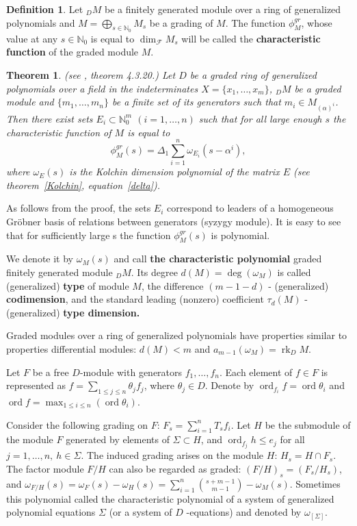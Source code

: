 \documentclass[a4paper,reqno,12pt]{amsart}
\theoremstyle{plain}
\newtheorem{theorem}{Theorem}
\theoremstyle{remark}
\theoremstyle{definition}
\newtheorem{definition}{Definition}
\renewcommand{\le}{\leqslant}
\DeclareMathOperator {\ord}{ord}
\DeclareMathOperator {\rk}{rk}
\newcommand{\N}{\mathbb{N}}
\def\deg{\operatorname{deg}}
\def\ord{\operatorname{ord}}
\def\F{\mathcal {F}}
\begin{document}
\begin{definition}
Let $_D M$ be a finitely generated module over a ring of generalized
polynomials and $M=\bigoplus_{s\in\N_0}M_{s}$ be
a grading of $M$. The function $\phi_M^{gr}$, whose value at
any  
$s\in\N_0$ is equal to 
$\dim_\F M_{s}$ will
be called the {\bf characteristic function} of the graded module $M$.
\end{definition}

\begin{theorem}\label{4.3.20} (see \cite{KLMP}, theorem 4.3.20.)
Let $D$ be a graded ring of generalized polynomials over a field in
the indeterminates $X=\{x_1,\dots,x_m\}$,
$_D M$ be a graded module and  $\{m_1,\dots,m_n\}$ be a finite
set of its generators such that $m_i\in M_{(\alpha)^i}$.
Then there exist sets $E_i\subset\N_0^m$ $(i=1,\dots,n)$ such that for all large
enough $s$ the characteristic function of $M$ is equal
to
\begin{equation}\label{eq0}
  \phi_M^{gr}(s)=\Delta_1
  \sum_{i=1}^n\omega_{E_i}(s-\alpha^i),
\end{equation}
where $\omega_E(s)$ 
is the Kolchin dimension
polynomial of the matrix $E$
(see theorem~\ref{Kolchin}, equation~\ref{delta}).
\end{theorem}

As follows from the proof, the sets $E_i$ correspond to
leaders of a homogeneous Gr\"obner basis of 
relations between generators (syzygy module).    It is easy to see that
for sufficiently large s the function  $\phi_M^{gr}(s)$
is polynomial.

We denote it by $\omega_M(s)$ and call {\bf the characteristic polynomial}
graded finitely generated module $_DM $.
Its degree $d(M) =\deg(\omega_M)$ is called (generalized)
{\bf type}  of
module $M$, the difference $(m-1-d)$ - (generalized) {\bf codimension},
and the standard leading (nonzero) coefficient $\tau_{d}(M) $ - (generalized)
{\bf type dimension.}
  
Graded modules over a ring of generalized polynomials
have properties similar to properties
differential modules: $d(M)<m$ and $a_{m-1} (\omega_M) = \rk_DM $.

Let $F$ be a free $D$-module with
generators
$ f_1, \dots, f_n $.
Each element of $f \in F$ is represented as
$f =\sum_ {1 \le j \le n} \theta_jf_j $, where $\theta_j \in D$.
Denote by
$\ord_{f_i} f = \ord \theta_i $ and $\ord f = \max_ {1 \le i \le n}
 (\ord\theta_i) $.


Consider the following grading on $F$:
$ F_s = \sum_ {i = 1} ^ n T_ {s} f_i $.
Let $H$ be the submodule of the module $F$ generated by 
elements of $\Sigma \subset H $,
and $\ord_{f_j} h \le e_j $ for all $j = 1, \dots, n, \ h \in \Sigma$.
The induced grading arises on the module $ H $:
$H_s = H \cap F_s $.
The factor module $F/H$ can also be regarded as graded:
$(F/H)_s = (F_s/H_s)$, and $\omega_ {F / H} (s) = \omega_F (s) - 
\omega_H (s) =
\sum_ {i = 1} ^ n \binom {s + m-1} {m-1} - \omega_M (s) $.
Sometimes this polynomial
called the characteristic polynomial of a system of generalized 
polynomial   equations $\Sigma $ (or a system of $D$ -equations) and
denoted by $\omega_{[\Sigma]} $.
\end{document}
